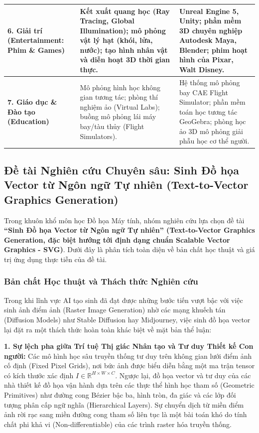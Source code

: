 \begin{table}[ht]
\begin{tabularx}{\textwidth}{|p{3.2cm}|X|X|}
\hline
\textbf{6. Giải trí (Entertainment: Phim \& Games)} & Kết xuất quang học (Ray Tracing, Global Illumination); mô phỏng vật lý hạt (khói, lửa, nước); tạo hình nhân vật và diễn hoạt 3D thời gian thực. & Unreal Engine 5, Unity; phần mềm 3D chuyên nghiệp Autodesk Maya, Blender; phim hoạt hình của Pixar, Walt Disney. \\
\hline
\textbf{7. Giáo dục \& Đào tạo (Education)} & Mô phỏng hình học không gian tương tác; phòng thí nghiệm ảo (Virtual Labs); buồng mô phỏng lái máy bay/tàu thủy (Flight Simulators). & Hệ thống mô phỏng bay CAE Flight Simulator; phần mềm toán học tương tác GeoGebra; phòng học ảo 3D mô phỏng giải phẫu học cơ thể người. \\
\hline
\end{tabularx}
\end{table}

\subsection{Đề tài Nghiên cứu Chuyên sâu: Sinh Đồ họa Vector từ Ngôn ngữ Tự nhiên (Text-to-Vector Graphics Generation)}

Trong khuôn khổ môn học Đồ họa Máy tính, nhóm nghiên cứu lựa chọn đề tài \textbf{``Sinh Đồ họa Vector từ Ngôn ngữ Tự nhiên'' (Text-to-Vector Graphics Generation, đặc biệt hướng tới định dạng chuẩn Scalable Vector Graphics - SVG)}. Dưới đây là phân tích toàn diện về bản chất học thuật và giá trị ứng dụng thực tiễn của đề tài.

\subsubsection{Bản chất Học thuật và Thách thức Nghiên cứu}

Trong khi lĩnh vực AI tạo sinh đã đạt được những bước tiến vượt bậc với việc sinh ảnh điểm ảnh (Raster Image Generation) nhờ các mạng khuếch tán (Diffusion Models) như Stable Diffusion hay Midjourney, việc sinh đồ họa vector lại đặt ra một thách thức hoàn toàn khác biệt về mặt bản thể luận:

\textbf{1. Sự lệch pha giữa Trí tuệ Thị giác Nhân tạo và Tư duy Thiết kế Con người:}
Các mô hình học sâu truyền thống tư duy trên không gian lưới điểm ảnh cố định (Fixed Pixel Grids), nơi bức ảnh được biểu diễn bằng một ma trận tensor có kích thước xác định $I \in \mathbb{R}^{H \times W \times C}$. Ngược lại, đồ họa vector và tư duy của các nhà thiết kế đồ họa vận hành dựa trên các thực thể hình học tham số (Geometric Primitives) như đường cong Bézier bậc ba, hình tròn, đa giác và các lớp đối tượng phân cấp ngữ nghĩa (Hierarchical Layers). Sự chuyển dịch từ miền điểm ảnh rời rạc sang miền đường cong tham số liên tục là một bài toán khó do tính chất phi khả vi (Non-differentiable) của các trình raster hóa truyền thống.

